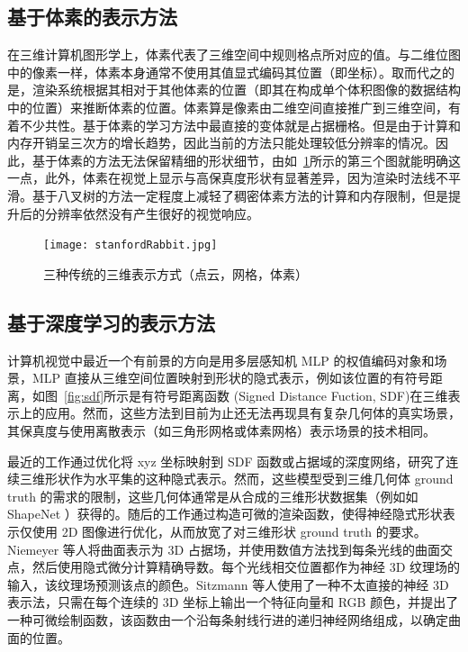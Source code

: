 \subsection{基于体素的表示方法}
在三维计算机图形学上，体素代表了三维空间中规则格点所对应的值。与二维位图中的像素一样，体素本身通常不使用其值显式编码其位置（即坐标）。取而代之的是，渲染系统根据其相对于其他体素的位置（即其在构成单个体积图像的数据结构中的位置）来推断体素的位置。体素算是像素由二维空间直接推广到三维空间，有着不少共性。基于体素的学习方法中最直接的变体就是占据栅格。但是由于计算和内存开销呈三次方的增长趋势，因此当前的方法只能处理较低分辨率的情况。因此，基于体素的方法\cite{20153D,Choy20163D}无法保留精细的形状细节，由如~\ref{fig:stanfordRabbit}所示的第三个图就能明确这一点，此外，体素在视觉上显示与高保真度形状有显著差异，因为渲染时法线不平滑。基于八叉树\cite{Tatarchenko2017Octree,riegler2017octnet,hane2017hierarchical}的方法一定程度上减轻了稠密体素方法的计算和内存限制，但是提升后的分辨率依然没有产生很好的视觉响应。

\begin{figure}[t]
  \centering
  \texttt{[image: stanfordRabbit.jpg]}
  \caption{三种传统的三维表示方式（点云，网格，体素）}
  \label{fig:stanfordRabbit}
\end{figure}

\subsection{基于深度学习的表示方法}
计算机视觉中最近一个有前景的方向是用多层感知机 MLP 的权值编码对象和场景，MLP 直接从三维空间位置映射到形状的隐式表示，例如该位置的有符号距离\cite{curless1996volumetric}，如图~\ref{fig:sdf}所示是有符号距离函数 (Signed Distance Fuction, SDF)在三维表示上的应用。然而，这些方法到目前为止还无法再现具有复杂几何体的真实场景，其保真度与使用离散表示（如三角形网格或体素网格）表示场景的技术相同。

最近的工作通过优化将 xyz 坐标映射到 SDF 函数\cite{jiang2020local,park2019deepsdf,chabra2020deep}或占据域\cite{genova2020local,mescheder2019occupancy}的深度网络，研究了连续三维形状作为水平集的这种隐式表示。然而，这些模型受到三维几何体 ground truth 的需求的限制，这些几何体通常是从合成的三维形状数据集（例如如 ShapeNet\cite{chang2015shapenet} ）获得的。随后的工作通过构造可微的渲染函数，使得神经隐式形状表示仅使用 2D 图像进行优化，从而放宽了对三维形状 ground truth 的要求。Niemeyer 等人\cite{niemeyer2020differentiable}将曲面表示为 3D 占据场，并使用数值方法找到每条光线的曲面交点，然后使用隐式微分计算精确导数。每个光线相交位置都作为神经 3D 纹理场的输入，该纹理场预测该点的颜色。Sitzmann 等人\cite{sitzmann2019scene}使用了一种不太直接的神经 3D 表示法，只需在每个连续的 3D 坐标上输出一个特征向量和 RGB 颜色，并提出了一种可微绘制函数，该函数由一个沿每条射线行进的递归神经网络组成，以确定曲面的位置。

